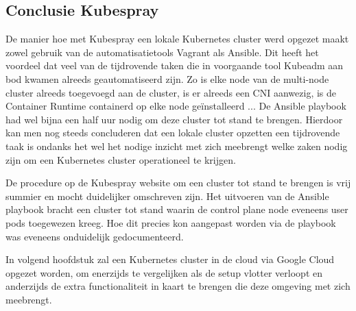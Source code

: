 \subsection{Conclusie Kubespray}

De manier hoe met Kubespray een lokale Kubernetes cluster werd opgezet maakt zowel gebruik van de automatisatietools Vagrant als Ansible. Dit heeft het voordeel dat veel van de tijdrovende taken die in voorgaande tool Kubeadm aan bod kwamen alreeds geautomatiseerd zijn. Zo is elke node van de multi-node cluster alreeds toegevoegd aan de cluster, is er alreeds een CNI aanwezig, is de Container Runtime containerd op elke node geïnstalleerd ... De Ansible playbook had wel bijna een half uur nodig om deze cluster tot stand te brengen. Hierdoor kan men nog steeds concluderen dat een lokale cluster opzetten een tijdrovende taak is ondanks het wel het nodige inzicht met zich meebrengt welke zaken nodig zijn om een Kubernetes cluster operationeel te krijgen. 

De procedure op de Kubespray website om een cluster tot stand te brengen is vrij summier en mocht duidelijker omschreven zijn. Het uitvoeren van de Ansible playbook bracht een cluster tot stand waarin de control plane node eveneens user pods toegewezen kreeg. Hoe dit precies kon aangepast worden via de playbook was eveneens onduidelijk gedocumenteerd. 

In volgend hoofdstuk zal een Kubernetes cluster in de cloud via Google Cloud opgezet worden, om enerzijds te vergelijken als de setup vlotter verloopt en anderzijds de extra functionaliteit in kaart te brengen die deze omgeving met zich meebrengt.